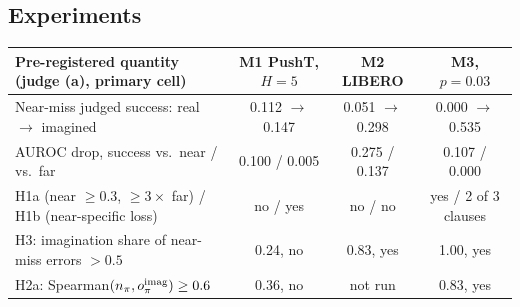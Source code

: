 \documentclass[nouppercase]{kaia}
\begin{document}
\begin{mdframed}
\subsection{Experiments}
{\centering\footnotesize
\setlength{\tabcolsep}{4pt}
\begin{tabular}{lccc}
\toprule
Pre-registered quantity (judge (a), primary cell) & M1 PushT, $H=5$ & M2 LIBERO & M3, $p=0.03$ \\
\midrule
Near-miss judged success: real $\rightarrow$ imagined & 0.112 $\rightarrow$ 0.147 & 0.051 $\rightarrow$ 0.298 & 0.000 $\rightarrow$ 0.535 \\
AUROC drop, success vs.\ near / vs.\ far & 0.100 / 0.005 & 0.275 / 0.137 & 0.107 / 0.000 \\
H1a (near $\ge 0.3$, $\ge 3\times$ far) / H1b (near-specific loss) & no / yes & no / no & yes / 2 of 3 clauses \\
H3: imagination share of near-miss errors $>0.5$ & 0.24, no & 0.83, yes & 1.00, yes \\
H2a: Spearman$(n_\pi, o^{\rm imag}_\pi)\ge 0.6$ & 0.36, no & not run & 0.83, yes \\
\bottomrule
\end{tabular}\par
{}\label{tab:tests}\par}
\smallskip


\end{mdframed}
\end{document}
